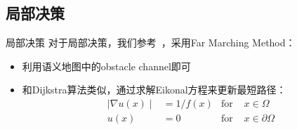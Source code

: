 \subsection{局部决策}
\begin{frame}{局部决策}
    对于局部决策，我们参考~\cite*{chaplot2020object}，采用Far Marching Method：
    \begin{itemize}
        \item 利用语义地图中的obstacle channel即可
        \item 和Dijkstra算法类似，通过求解Eikonal方程来更新最短路径：
              $$
                  \begin{aligned}
                      \mid\nabla u(x)\mid & =1/f(x) & \text{for } & x\in\Omega         \\
                      u(x)                & =0      & \text{for } & x\in\partial\Omega
                  \end{aligned}
              $$
    \end{itemize}
\end{frame}


